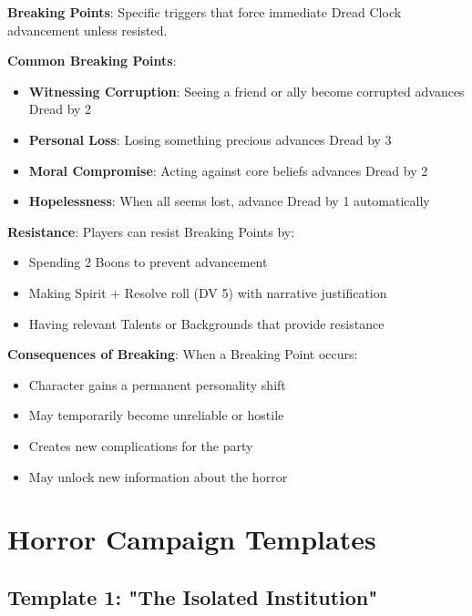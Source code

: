 \documentclass[11pt]{article}
\begin{document}
\begin{mdframed}[backgroundcolor=sanitybg]
\textbf{Breaking Points}: Specific triggers that force immediate Dread Clock advancement unless resisted.

\textbf{Common Breaking Points}:
\begin{itemize}[leftmargin=*]
\item \textbf{Witnessing Corruption}: Seeing a friend or ally become corrupted advances Dread by 2
\item \textbf{Personal Loss}: Losing something precious advances Dread by 3
\item \textbf{Moral Compromise}: Acting against core beliefs advances Dread by 2
\item \textbf{Hopelessness}: When all seems lost, advance Dread by 1 automatically
\end{itemize}

\textbf{Resistance}: Players can resist Breaking Points by:
\begin{itemize}[leftmargin=*]
\item Spending 2 Boons to prevent advancement
\item Making Spirit + Resolve roll (DV 5) with narrative justification
\item Having relevant Talents or Backgrounds that provide resistance
\end{itemize}

\textbf{Consequences of Breaking}: When a Breaking Point occurs:
\begin{itemize}[leftmargin=*]
\item Character gains a permanent personality shift
\item May temporarily become unreliable or hostile
\item Creates new complications for the party
\item May unlock new information about the horror
\end{itemize}
\end{mdframed}

\section*{Horror Campaign Templates}

\subsection*{Template 1: "The Isolated Institution"}
\end{document}
